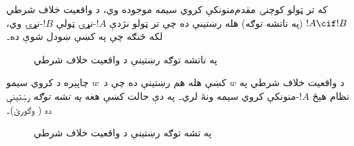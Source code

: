 \documentclass[../../../include/open-logic-section]{subfiles}
\begin{document}


که تر ټولو کوچنۍ مقدم‌منونکې کروي سيمه موجوده وي، د
واقعيت خلاف شرطي $!A \cif !B$ (په ناتشه توګه) هله رښتينې
ده چې تر ټولو نژدې $!A$-نړۍ ټولې $!B$-نړۍ وي، لکه څنګه چې په
 کښې ښودل شوې ده۔
\begin{figure}
\begin{center}
\caption{په ناتشه توګه رښتينې د واقعيت خلاف شرطي}
\end{center}
\end{figure}
د واقعيت خلاف شرطي په $w$ کښې هله هم رښتينې ده چې
د~$w$ چاپېره د کروي سيمو نظام هېڅ $!A$-منونکې کروي سيمه
ونۀ لري۔ په دې حالت کښې هغه \emph{په تشه توګه} رښتينې ده
( وګورئ)۔
\begin{figure}
\begin{center}
\caption{په تشه توګه رښتينې د واقعيت خلاف شرطي}
\end{center}
\end{figure}
\end{document}

